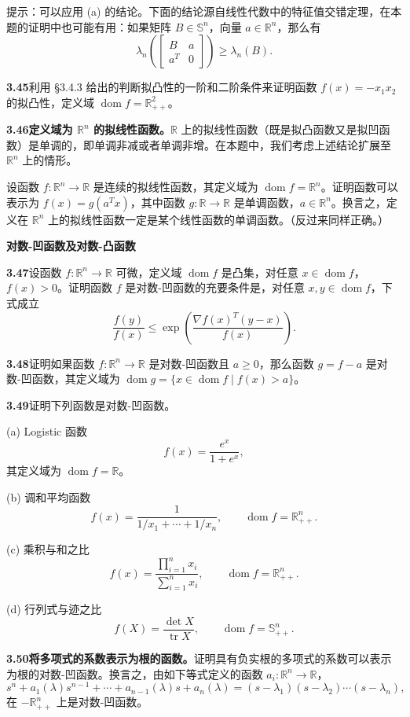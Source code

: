 \documentclass[UTF8,12pt,a4paper,fontset=fandol]{ctexart}
\DeclareMathOperator{\dom}{dom}
\begin{document}
提示：可以应用 (a) 的结论。下面的结论源自线性代数中的特征值交错定理，在本题的证明中也可能有用：如果矩阵 $B\in\mathbb{S}^n$，向量 $a\in\mathbb{R}^n$，那么有
\[
\lambda_n\left(
\begin{bmatrix}
B & a\\
a^T & 0
\end{bmatrix}
\right)\geq \lambda_n(B).
\]

\noindent\textbf{3.45}\quad 利用 \S3.4.3 给出的判断拟凸性的一阶和二阶条件来证明函数 $f(x)=-x_1x_2$ 的拟凸性，定义域 $\dom f=\mathbb{R}_{++}^2$。

\noindent\textbf{3.46\quad 定义域为 $\mathbb{R}^n$ 的拟线性函数。}\quad $\mathbb{R}$ 上的拟线性函数（既是拟凸函数又是拟凹函数）是单调的，即单调非减或者单调非增。在本题中，我们考虑上述结论扩展至 $\mathbb{R}^n$ 上的情形。

设函数 $f:\mathbb{R}^n\to\mathbb{R}$ 是连续的拟线性函数，其定义域为 $\dom f=\mathbb{R}^n$。证明函数可以表示为 $f(x)=g(a^Tx)$，其中函数 $g:\mathbb{R}\to\mathbb{R}$ 是单调函数，$a\in\mathbb{R}^n$。换言之，定义在 $\mathbb{R}^n$ 上的拟线性函数一定是某个线性函数的单调函数。（反过来同样正确。）

\noindent\textbf{对数-凹函数及对数-凸函数}

\noindent\textbf{3.47}\quad 设函数 $f:\mathbb{R}^n\to\mathbb{R}$ 可微，定义域 $\dom f$ 是凸集，对任意 $x\in\dom f$，$f(x)>0$。证明函数 $f$ 是对数-凹函数的充要条件是，对任意 $x,y\in\dom f$，下式成立
\[
\frac{f(y)}{f(x)}\leq \exp\left(\frac{\nabla f(x)^T(y-x)}{f(x)}\right).
\]

\noindent\textbf{3.48}\quad 证明如果函数 $f:\mathbb{R}^n\to\mathbb{R}$ 是对数-凹函数且 $a\geq0$，那么函数 $g=f-a$ 是对数-凹函数，其定义域为 $\dom g=\{x\in\dom f\mid f(x)>a\}$。

\noindent\textbf{3.49}\quad 证明下列函数是对数-凹函数。

(a) Logistic 函数
\[
f(x)=\frac{e^x}{1+e^x},
\]
其定义域为 $\dom f=\mathbb{R}$。

(b) 调和平均函数
\[
f(x)=\frac{1}{1/x_1+\cdots+1/x_n},\qquad \dom f=\mathbb{R}_{++}^n.
\]

(c) 乘积与和之比
\[
f(x)=\frac{\prod_{i=1}^n x_i}{\sum_{i=1}^n x_i},\qquad \dom f=\mathbb{R}_{++}^n.
\]

(d) 行列式与迹之比
\[
f(X)=\frac{\det X}{\operatorname{tr}X},\qquad \dom f=\mathbb{S}_{++}^n.
\]

\noindent\textbf{3.50\quad 将多项式的系数表示为根的函数。}\quad 证明具有负实根的多项式的系数可以表示为根的对数-凹函数。换言之，由如下等式定义的函数 $a_i:\mathbb{R}^n\to\mathbb{R}$，
\[
s^n+a_1(\lambda)s^{n-1}+\cdots+a_{n-1}(\lambda)s+a_n(\lambda)=(s-\lambda_1)(s-\lambda_2)\cdots(s-\lambda_n),
\]
在 $-\mathbb{R}_{++}^n$ 上是对数-凹函数。
\end{document}

